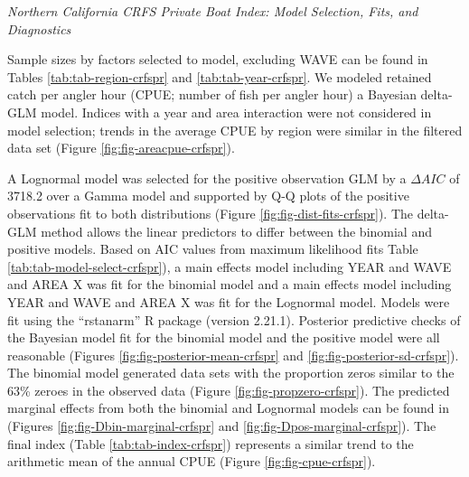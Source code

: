 \documentclass[11pt,
  english,
  a4paper,
]{article}
\begin{document}
\emph{Northern California CRFS Private Boat Index: Model Selection, Fits, and Diagnostics}

Sample sizes by factors selected to model, excluding WAVE can be found in Tables \ref{tab:tab-region-crfspr} and \ref{tab:tab-year-crfspr}. We modeled retained catch per angler hour (CPUE; number of fish per angler hour) a Bayesian delta-GLM model. Indices with a year and area interaction were not considered in model selection; trends in the average CPUE by region were similar in the filtered data set (Figure \ref{fig:fig-areacpue-crfspr}).

A Lognormal model was selected for the positive observation GLM by a {\(\Delta AIC\)\leavevmode\tagmcend\tagstructend} of 3718.2 over a Gamma model and supported by Q-Q plots of the positive observations fit to both distributions (Figure \ref{fig:fig-dist-fits-crfspr}). The delta-GLM method allows the linear predictors to differ between the binomial and positive models. Based on AIC values from maximum likelihood fits Table \ref{tab:tab-model-select-crfspr}), a main effects model including YEAR and WAVE and AREA X was fit for the binomial model and a main effects model including YEAR and WAVE and AREA X was fit for the Lognormal model. Models were fit using the ``rstanarm'' R package (version 2.21.1). Posterior predictive checks of the Bayesian model fit for the binomial model and the positive model were all reasonable (Figures \ref{fig:fig-posterior-mean-crfspr} and \ref{fig:fig-posterior-sd-crfspr}). The binomial model generated data sets with the proportion zeros similar to the 63\% zeroes in the observed data (Figure \ref{fig:fig-propzero-crfspr}). The predicted marginal effects from both the binomial and Lognormal models can be found in (Figures \ref{fig:fig-Dbin-marginal-crfspr} and \ref{fig:fig-Dpos-marginal-crfspr}). The final index (Table \ref{tab:tab-index-crfspr}) represents a similar trend to the arithmetic mean of the annual CPUE (Figure \ref{fig:fig-cpue-crfspr}).

\newpage
\end{document}
